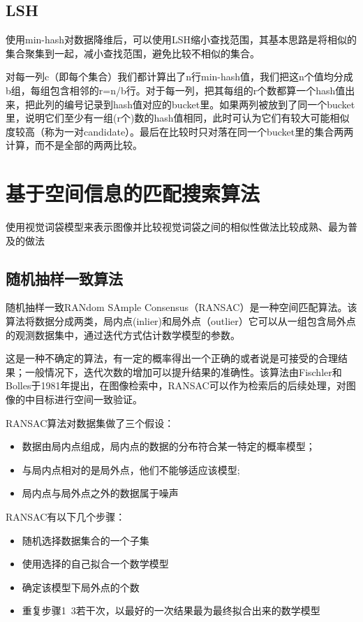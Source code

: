 \subsection{LSH}
使用min-hash对数据降维后，可以使用LSH缩小查找范围，其基本思路是将相似的集合聚集到一起，减小查找范围，避免比较不相似的集合。

对每一列c（即每个集合）我们都计算出了n行min-hash值，我们把这n个值均分成b组，每组包含相邻的r=n/b行。对于每一列，把其每组的r个数都算一个hash值出来，把此列的编号记录到hash值对应的bucket里。如果两列被放到了同一个bucket里，说明它们至少有一组(r个)数的hash值相同，此时可认为它们有较大可能相似度较高（称为一对candidate）。最后在比较时只对落在同一个bucket里的集合两两计算，而不是全部的两两比较。


\section{基于空间信息的匹配搜索算法}
使用视觉词袋模型来表示图像并比较视觉词袋之间的相似性做法比较成熟、最为普及的做法
\subsection{随机抽样一致算法}
随机抽样一致RANdom SAmple Consensus（RANSAC）是一种空间匹配算法。该算法将数据分成两类，局内点(inlier)和局外点（outlier）它可以从一组包含局外点的观测数据集中，通过迭代方式估计数学模型的参数。

这是一种不确定的算法，有一定的概率得出一个正确的或者说是可接受的合理结果；一般情况下，迭代次数的增加可以提升结果的准确性。该算法由Fischler和Bolles于1981年提出，在图像检索中，RANSAC可以作为检索后的后续处理，对图像的中目标进行空间一致验证。

RANSAC算法对数据集做了三个假设：

\begin{itemize}
\item 数据由局内点组成，局内点的数据的分布符合某一特定的概率模型；
\item 与局内点相对的是局外点，他们不能够适应该模型;
\item 局内点与局外点之外的数据属于噪声
\end{itemize}

RANSAC有以下几个步骤：
\begin{itemize}
\item 随机选择数据集合的一个子集
\item 使用选择的自己拟合一个数学模型
\item 确定该模型下局外点的个数
\item 重复步骤1~3若干次，以最好的一次结果最为最终拟合出来的数学模型
\end{itemize}

